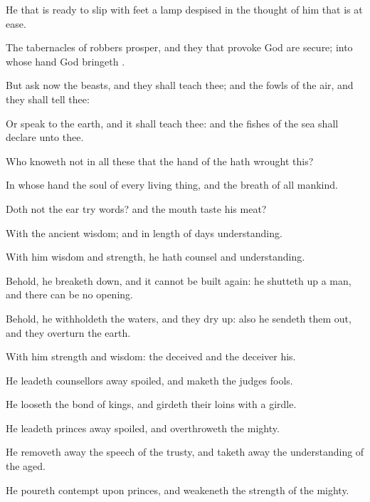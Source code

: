 {He that is
ready to
slip with
{}
feet
{} a
lamp
despised in the
thought of him that is at
ease.


\par }{\PP {}The
tabernacles of
robbers
prosper, and they that
provoke
God are
secure; into whose
hand
God
bringeth
{}.

But
ask now the
beasts, and they shall
teach thee; and the
fowls of the
air, and they shall
tell thee:

Or
speak to the
earth, and it shall
teach thee: and the
fishes of the
sea shall
declare unto thee.

Who
knoweth not in all these that the
hand of the
{} hath
wrought this?

In whose
hand
{} the
soul of every living
thing, and the
breath of all
mankind.

Doth not the
ear
try
words? and the
mouth
taste his
meat?


\par }{\PP {}With the
ancient
{}
wisdom; and in
length of
days
understanding.

With him
{}
wisdom and
strength, he hath
counsel and
understanding.

Behold, he breaketh
down, and it cannot be built
again: he shutteth
up a
man, and there can be no
opening.

Behold, he
withholdeth the
waters, and they dry
up: also he sendeth them
out, and they
overturn the
earth.

With him
{}
strength and
wisdom: the
deceived and the
deceiver
{} his.

He
leadeth
counsellors away
spoiled, and maketh the
judges
fools.

He
looseth the
bond of
kings, and
girdeth their
loins with a
girdle.

He
leadeth
princes away
spoiled, and
overthroweth the
mighty.

He removeth
away the
speech of the
trusty, and taketh
away the
understanding of the
aged.

He
poureth
contempt upon
princes, and
weakeneth the
strength of the
mighty.

}
